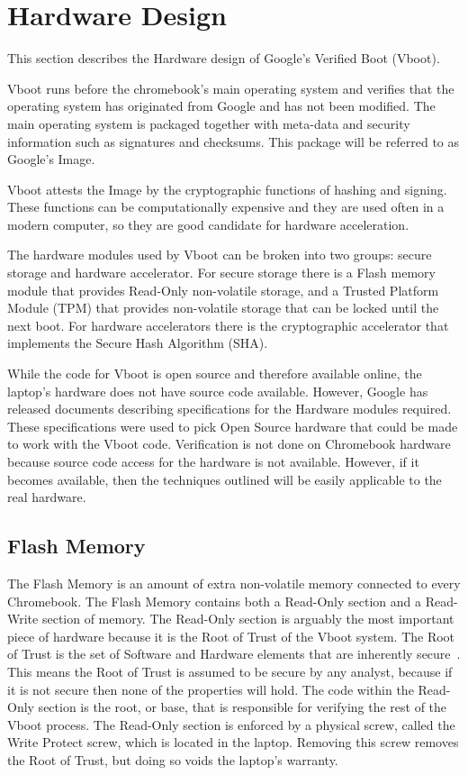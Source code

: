 \chapter{Hardware Design}

This section describes the Hardware design of Google's Verified Boot (Vboot). 

Vboot runs before the chromebook's main operating system and verifies that the operating system has originated from Google and has not been modified.
The main operating system is packaged together with meta-data and security information such as signatures and checksums. 
This package will be referred to as Google's Image.

Vboot attests the Image by the cryptographic functions of hashing and signing.
These functions can be computationally expensive and they are used often in a
modern computer, so they are good candidate for hardware acceleration.  

The hardware modules used by Vboot can be broken into two groups: secure storage and hardware accelerator.
For secure storage there is a Flash memory module that provides 
Read-Only non-volatile storage, and a Trusted Platform Module (TPM) that provides non-volatile storage that can be locked until the next boot.
For hardware accelerators there is the cryptographic accelerator that
implements the Secure Hash Algorithm (SHA).

While the code for Vboot is open source and therefore available online, the laptop's
hardware does not have source code available.
However, Google has released documents describing specifications for the
Hardware modules required. 
These specifications were used to pick Open Source hardware that could be made
to work with the Vboot code. 
Verification is not done on Chromebook hardware because source code access for
the hardware is not available. 
However, if it becomes available, then the techniques outlined will be easily
applicable to the real hardware. 

\section{Flash Memory}\label{flash_mem}

The Flash Memory is an amount of extra non-volatile memory connected to every Chromebook. 
The Flash Memory contains both a Read-Only section and a Read-Write section of memory.
The Read-Only section is arguably the most important piece of hardware because it is the Root of Trust of the Vboot system.
The Root of Trust is the set of Software and Hardware elements that are
inherently secure~\cite{RoT}.
This means the Root of Trust is assumed to be secure by any analyst, because if it is not secure then none of the properties will hold.
The code within the Read-Only section is the root, or base, that is responsible for verifying the rest of the Vboot process.
The Read-Only section is enforced by a physical screw, called the Write Protect screw, which is located in the laptop.
Removing this screw removes the Root of Trust, but doing so voids the laptop's warranty.

